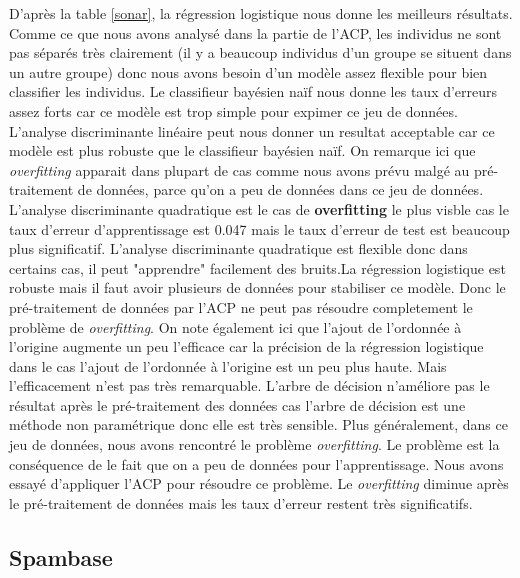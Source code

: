 \documentclass[a4paper,11pt,oneside,roman]{article}
\begin{document}
D'après la table \ref{sonar}, la régression logistique nous donne les meilleurs résultats. Comme ce que nous avons analysé dans la partie de l'ACP, les individus ne sont pas séparés très clairement (il y a beaucoup individus d'un groupe se situent dans un autre groupe) donc nous avons besoin d'un modèle assez flexible pour bien classifier les individus. Le classifieur bayésien naïf nous donne les taux d'erreurs assez forts car ce modèle est trop simple pour expimer ce jeu de données. L'analyse discriminante linéaire peut nous donner un resultat acceptable car ce modèle est plus robuste que le classifieur bayésien naïf. On remarque ici que \textit{overfitting} apparait dans plupart de cas comme nous avons prévu malgé au pré-traitement de données, parce qu'on a peu de données dans ce jeu de données. L'analyse discriminante quadratique est le cas de \textbf{overfitting} le plus visble cas le taux d'erreur d'apprentissage est 0.047 mais le taux d'erreur de test est beaucoup plus significatif. L'analyse discriminante quadratique est flexible donc dans certains cas, il peut "apprendre" facilement des bruits.La régression logistique est robuste mais il faut avoir plusieurs de données pour stabiliser ce modèle. Donc le pré-traitement de données par l'ACP ne peut pas résoudre completement le problème de \textit{overfitting}.  On note également ici que l'ajout de l'ordonnée à l'origine  augmente un peu l'efficace car la précision de la régression logistique dans le cas l'ajout de l'ordonnée à l'origine est un peu plus haute. Mais l'efficacement n'est pas très remarquable. L'arbre de décision n'améliore pas le résultat après le pré-traitement des données cas l'arbre de décision est une méthode non paramétrique donc elle est très sensible. Plus généralement, dans ce jeu de données, nous avons rencontré le problème \textit{overfitting}. Le problème est la conséquence de le fait que on a peu de données pour l'apprentissage. Nous avons essayé d'appliquer l'ACP pour résoudre ce problème. Le \textit{overfitting} diminue après le pré-traitement de données mais les taux d'erreur restent très significatifs. 




\subsection{Spambase}
\end{document}
